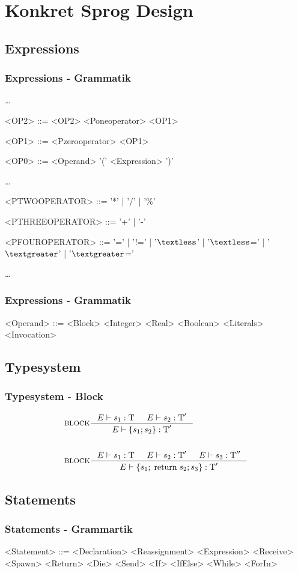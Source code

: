 \section{Konkret Sprog Design}
\setlength{\grammarindent}{100pt}
\subsection{Expressions}
\begin{frame}
	\frametitle{Expressions - Grammatik}
	\dots
	\begin{grammar}
	<OP2> ::= <OP2> <Poneoperator> <OP1>
  
	<OP1> ::= <Pzerooperator> <OP1>

  <OP0> ::= <Operand>
  \alt '(' <Expression> ')'
  \end{grammar}
	\dots
	\begin{grammar}
	<PTWOOPERATOR> ::= '*' | '/' | '\%'
	
	<PTHREEOPERATOR> ::= '+' | '-'
	
	<PFOUROPERATOR> ::= '=' | '!=' | '$\textless$' | '$\textless$=' | '$\textgreater$' | '$\textgreater$='
	\end{grammar}
	\dots
\end{frame}

\begin{frame}
	\frametitle{Expressions - Grammatik}
	\begin{grammar}
  <Operand> ::= <Block>
    \alt <Integer>
    \alt <Real>
    \alt <Boolean>
    \alt <Literals>
    \alt <Invocation>
  \end{grammar}
\end{frame}

\subsection{Typesystem}
\begin{frame}
	\frametitle{Typesystem - Block}
	\begin{align*}
  &\inference[BLOCK]{\Tenv s_1: \Tt & \Tenv s_2: \Tt'}
                    {\Tenv \{s_1; s_2\} : \Tt'}
	\\\\
  &\inference[BLOCK]{\Tenv s_1: \Tt & \Tenv s_2: \Tt' & \Tenv s_3: \Tt''}
                    {\Tenv \{s_1; \;\Treturn\; s_2; s_3\} : \Tt'}
  \end{align*}
\end{frame}

\subsection{Statements}
\begin{frame}
  \frametitle{Statements - Grammartik}
	\begin{grammar}
  <Statement> ::= <Declaration>
    \alt <Reassignment>
    \alt <Expression>
    \alt <Receive>
    \alt <Spawn>
    \alt <Return>
    \alt <Die>
    \alt <Send>
    \alt <If>
    \alt <IfElse>
    \alt <While>
    \alt <ForIn>
  \end{grammar}
\end{frame}

